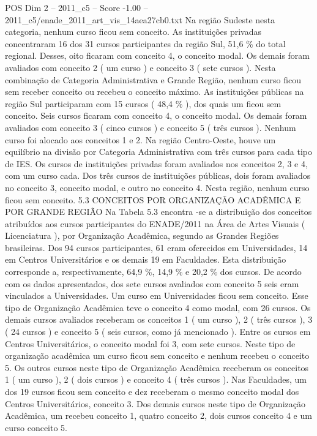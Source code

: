 \begin{textsample}{POS Dim 2 – 2011\_c5 – Score -1.00 – 2011\_c5/enade\_2011\_art\_vis\_14aea27cb0.txt}
Na região Sudeste nesta categoria, nenhum curso ficou sem conceito.
As instituições privadas concentraram 16 dos 31 cursos participantes da região Sul, 51,6 \% do total regional.
Desses, oito ficaram com conceito 4, o conceito modal.
Os demais foram avaliados com conceito 2 ( um curso ) e conceito 3 ( sete cursos ).
Nesta combinação de Categoria Administrativa e Grande Região, nenhum curso ficou sem receber conceito ou recebeu o conceito máximo.
As instituições públicas na região Sul participaram com 15 cursos ( 48,4 \% ), dos quais um ficou sem conceito.
Seis cursos ficaram com conceito 4, o conceito modal.
Os demais foram avaliados com conceito 3 ( cinco cursos ) e conceito 5 ( três cursos ).
Nenhum curso foi alocado aos conceitos 1 e 2.
Na região Centro-Oeste, houve um equilíbrio na divisão por Categoria Administrativa com três cursos para cada tipo de IES.
Os cursos de instituições privadas foram avaliados nos conceitos 2, 3 e 4, com um curso cada.
Dos três cursos de instituições públicas, dois foram avaliados no conceito 3, conceito modal, e outro no conceito 4.
Nesta região, nenhum curso ficou sem conceito. 5.3 CONCEITOS POR ORGANIZAÇÃO ACADÊMICA E POR GRANDE REGIÃO Na Tabela 5.3 encontra -se a distribuição dos conceitos atribuídos aos cursos participantes do ENADE/2011 na Área de Artes Visuais ( Licenciatura ), por Organização Acadêmica, segundo as Grandes Regiões brasileiras.
Dos 94 cursos participantes, 61 eram oferecidos em Universidades, 14 em Centros Universitários e os demais 19 em Faculdades.
Esta distribuição corresponde a, respectivamente, 64,9 \%, 14,9 \% e 20,2 \% dos cursos.
De acordo com os dados apresentados, dos sete cursos avaliados com conceito 5 seis eram vinculados a Universidades.
Um curso em Universidades ficou sem conceito.
Esse tipo de Organização Acadêmica teve o conceito 4 como modal, com 26 cursos.
Os demais cursos avaliados receberam os conceitos 1 ( um curso ), 2 ( três cursos ), 3 ( 24 cursos ) e conceito 5 ( seis cursos, como já mencionado ).
Entre os cursos em Centros Universitários, o conceito modal foi 3, com sete cursos.
Neste tipo de organização acadêmica um curso ficou sem conceito e nenhum recebeu o conceito 5.
Os outros cursos neste tipo de Organização Acadêmica receberam os conceitos 1 ( um curso ), 2 ( dois cursos ) e conceito 4 ( três cursos ).
Nas Faculdades, um dos 19 cursos ficou sem conceito e dez receberam o mesmo conceito modal dos Centros Universitários, conceito 3.
Dos demais cursos neste tipo de Organização Acadêmica, um recebeu conceito 1, quatro conceito 2, dois cursos conceito 4 e um curso conceito 5.

\end{textsample}
